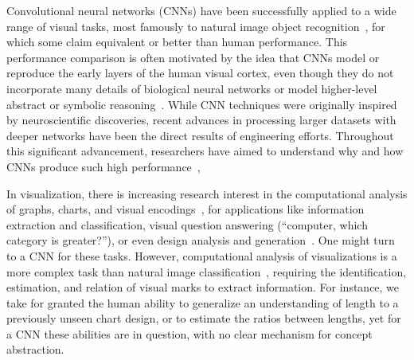 \maketitle
\vspace{-0.1cm}


Convolutional neural networks (CNNs) have been successfully applied to a wide range of visual tasks, most famously to natural image object recognition~\cite{simonyan_very_deep2014, szegedy2015}, for which some claim equivalent or better than human performance. This performance comparison is often motivated by the idea that CNNs model or reproduce the early layers of the human visual cortex, even though they do not incorporate many details of biological neural networks or model higher-level abstract or symbolic reasoning~\cite{yamins2016using, hassabis2017neuroscience, human_vs_machine_vision}. While CNN techniques were originally inspired by neuroscientific discoveries, recent advances in processing larger datasets with deeper networks have been the direct results of engineering efforts. Throughout this significant advancement, researchers have aimed to understand why and how CNNs produce such high performance~\cite{deeplearning_blackbox2017}, 

In visualization, there is increasing research interest in the computational analysis of graphs, charts, and visual encodings~\cite{maneesh_deconstructing_d3,Pineo2012_computational_perception,kafle2018dvqa}, for applications like information extraction and classification, visual question answering (``computer, which category is greater?''), or even design analysis and generation~\cite{Viegas2016}. One might turn to a CNN for these tasks. However, computational analysis of visualizations is a more complex task than natural image classification~\cite{Kahou2018}, requiring the identification, estimation, and relation of visual marks to extract information. For instance, we take for granted the human ability to generalize an understanding of length to a previously unseen chart design, or to estimate the ratios between lengths, yet for a CNN these abilities are in question, with no clear mechanism for concept abstraction.

